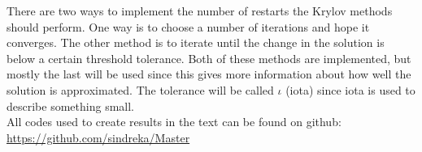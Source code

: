 \noindent There are two ways to implement the number of restarts the Krylov methods should perform. One way is to choose a number of iterations and hope it converges. The other method is to iterate until the change in the solution is below a certain threshold tolerance. Both of these methods are implemented, but mostly the last will be used since this gives more information about how well the solution is approximated. The tolerance will be called $\iota$ (iota) since iota is used to describe something small\cite{iota}.\\

\noindent All codes used to create results in the text can be found on github: \\
\url{https://github.com/sindreka/Master}


